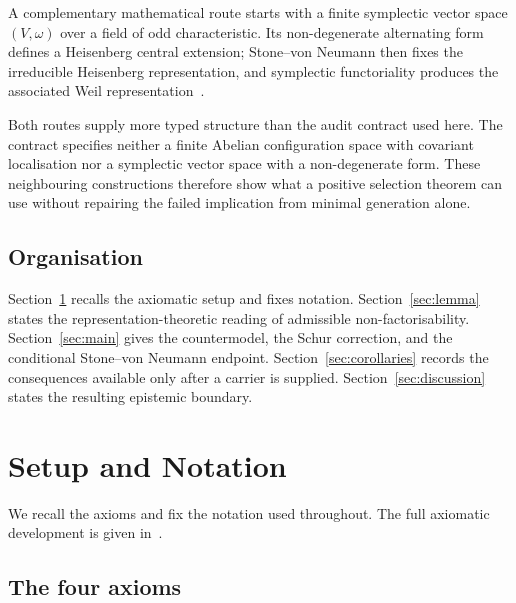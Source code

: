 \documentclass[11pt,a4paper]{article}
\begin{document}
    A complementary mathematical route starts with a finite symplectic vector
    space $(V,\omega)$ over a field of odd characteristic.
    Its non-degenerate alternating form defines a Heisenberg central extension;
    Stone--von Neumann then fixes the irreducible Heisenberg representation, and
    symplectic functoriality produces the associated Weil
    representation~\cite{GurevichHadani2009}.

    Both routes supply more typed structure than the audit contract used here.
    The contract specifies neither a finite Abelian configuration space with
    covariant localisation nor a symplectic vector space with a non-degenerate
    form.
    These neighbouring constructions therefore show what a positive selection
    theorem can use without repairing the failed implication from minimal
    generation alone.

  \subsection*{Organisation}

    Section~\ref{sec:setup} recalls the axiomatic setup and fixes notation.
    Section~\ref{sec:lemma} states the representation-theoretic reading of
    admissible non-factorisability.
    Section~\ref{sec:main} gives the countermodel, the Schur correction, and the
    conditional Stone--von Neumann endpoint.
    Section~\ref{sec:corollaries} records the consequences available only after
    a carrier is supplied.
    Section~\ref{sec:discussion} states the resulting epistemic boundary.

    \clearpage
  \section{Setup and Notation}
  \label{sec:setup}

  We recall the axioms and fix the notation used throughout.
  The full axiomatic development is given in~\cite{Foundation}.

  \subsection{The four axioms}
\end{document}
